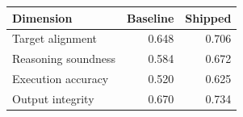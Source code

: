 \begin{tabular}{lrr}
\toprule
Dimension & Baseline & Shipped \\
\midrule
Target alignment & 0.648 & 0.706 \\
Reasoning soundness & 0.584 & 0.672 \\
Execution accuracy & 0.520 & 0.625 \\
Output integrity & 0.670 & 0.734 \\
\bottomrule
\end{tabular}
